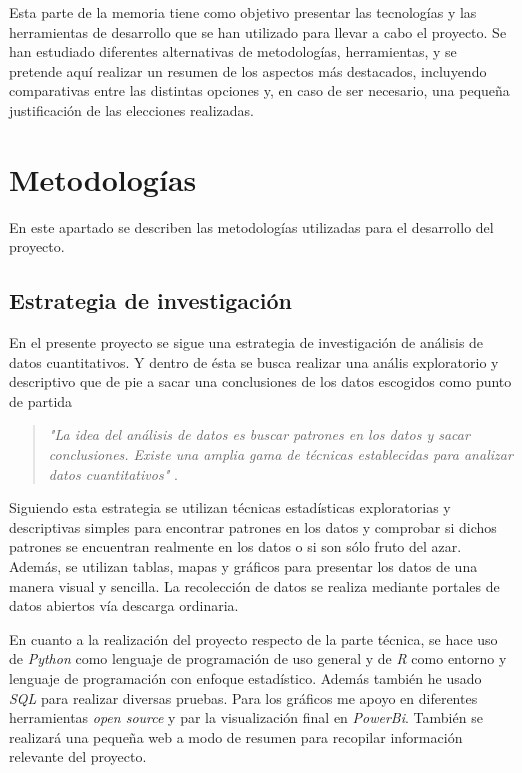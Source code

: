 
Esta parte de la memoria tiene como objetivo presentar las tecnologías y las herramientas de desarrollo que se han utilizado para llevar a cabo el proyecto. Se han estudiado diferentes alternativas de metodologías, herramientas, y se pretende aquí realizar un resumen de los aspectos más destacados, incluyendo comparativas entre las distintas opciones y, en caso de ser necesario, una pequeña justificación de las elecciones realizadas. 

\section{Metodologías}\label{metodologias}
En este apartado se describen las metodologías utilizadas para el desarrollo del proyecto.

\subsection{Estrategia de investigación}
En el presente proyecto se sigue una estrategia de investigación de análisis de datos cuantitativos. Y dentro de ésta se busca realizar una anális exploratorio y descriptivo que de pie a sacar una conclusiones de los datos escogidos como punto de partida

\begin{quote}
\textit{"La idea del análisis de datos es buscar patrones en los datos y sacar conclusiones. Existe una amplia gama de técnicas establecidas para analizar datos cuantitativos"} \cite{oates_researching_2006}. 
\end{quote}

Siguiendo esta estrategia se utilizan técnicas estadísticas exploratorias y descriptivas simples para encontrar patrones en los datos y comprobar si dichos patrones se encuentran realmente en los datos o si son sólo fruto del azar. Además, se utilizan tablas, mapas y gráficos para presentar los datos de una manera visual y sencilla. La recolección de datos se realiza mediante portales de datos abiertos vía descarga ordinaria. 

En cuanto a la realización del proyecto respecto de la parte técnica, se hace uso de \textit{Python} como lenguaje de programación de uso general y de \textit{R} como entorno y lenguaje de programación con enfoque estadístico. Además también he usado \textit{SQL} para realizar diversas pruebas. Para los gráficos me apoyo en diferentes herramientas \textit{open source} y par la visualización final en \textit{PowerBi}. También se realizará una pequeña web a modo de resumen para recopilar información relevante del proyecto. 


